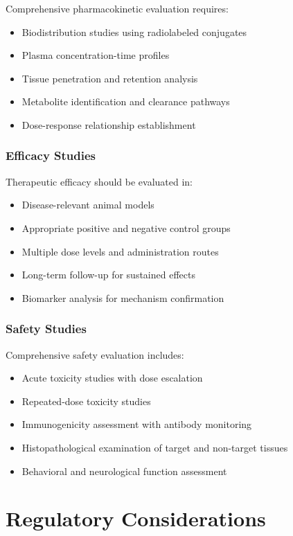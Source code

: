 \documentclass[11pt,a4paper]{article}
\begin{document}
Comprehensive pharmacokinetic evaluation requires:
\begin{itemize}
\item Biodistribution studies using radiolabeled conjugates
\item Plasma concentration-time profiles
\item Tissue penetration and retention analysis
\item Metabolite identification and clearance pathways
\item Dose-response relationship establishment
\end{itemize}

\subsubsection{Efficacy Studies}

Therapeutic efficacy should be evaluated in:
\begin{itemize}
\item Disease-relevant animal models
\item Appropriate positive and negative control groups
\item Multiple dose levels and administration routes
\item Long-term follow-up for sustained effects
\item Biomarker analysis for mechanism confirmation
\end{itemize}

\subsubsection{Safety Studies}

Comprehensive safety evaluation includes:
\begin{itemize}
\item Acute toxicity studies with dose escalation
\item Repeated-dose toxicity studies
\item Immunogenicity assessment with antibody monitoring
\item Histopathological examination of target and non-target tissues
\item Behavioral and neurological function assessment
\end{itemize}

\section{Regulatory Considerations}
\end{document}

